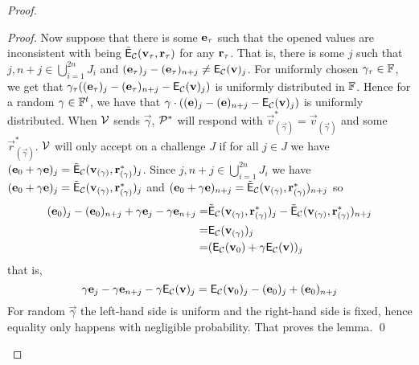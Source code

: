 \begin{proof}
\begin{proof}
Now suppose that there is some $\mathbf{e}_{\tau}$ such that the opened values are inconsistent with being $\tilde{\mathsf{E}}_{\mathcal{C}}(\mathbf{v}_\tau,\mathbf{r}_\tau)$ for any $\mathbf{r}_{\tau}$. That is, there is some $j$ such that $j,n+j\in \bigcup_{i=1}^{2n}J_i$ and $(\mathbf{e}_{\tau})_j-(\mathbf{e}_{\tau})_{n+j}\neq \mathsf{E}_{\mathcal{C}}(\mathbf{v})_j$. For uniformly chosen $\mathbf{\gamma}_\tau\in \mathbb{F}$, we get that $\mathbf{\gamma}_\tau((\mathbf{e}_{\tau})_j-(\mathbf{e}_{\tau})_{n+j}- \mathsf{E}_{\mathcal{C}}(\mathbf{v})_j)$ is uniformly distributed in $\mathbb{F}$. Hence for a random $\mathbf{\gamma}\in\mathbb{F}^t$, we have that $\mathbf{\gamma}\cdot ((\mathbf{e})_j-(\mathbf{e})_{n+j}- \mathsf{E}_{\mathcal{C}}(\mathbf{v})_j)$ is uniformly distributed. When $\mathcal{V}$ sends $\vec{\gamma}$, $\mathcal{P}^*$ will respond with $\vec{v}^*_{(\vec{\gamma})}=\vec{v}_{(\vec{\gamma})}$ and some $\vec{r}^*_{(\vec{\gamma})}$. 
$\mathcal{V}$ will only accept on a challenge $J$ if for all $j\in J$ we have $(\mathbf{e}_0+\mathbf{\gamma}\mathbf{e})_j=\tilde{\mathsf{E}}_{\mathcal{C}}(\mathbf{v}_{(\mathbf{\gamma})},\mathbf{r}^*_{(\mathbf{\gamma})})_j$. 
Since $j,n+j\in \bigcup_{i=1}^{2n} J_i$ we have $(\mathbf{e}_0+\mathbf{\gamma}\mathbf{e})_j=\tilde{\mathsf{E}}_{\mathcal{C}}(\mathbf{v}_{(\mathbf{\gamma})},\mathbf{r}^*_{(\mathbf{\gamma})})_j$ and $(\mathbf{e}_0+\mathbf{\gamma}\mathbf{e})_{n+j}=\tilde{\mathsf{E}}_{\mathcal{C}}(\mathbf{v}_{(\mathbf{\gamma})},\mathbf{r}^*_{(\mathbf{\gamma})})_{n+j}$ so 
\begin{align*}
(\mathbf{e}_0)_j-(\mathbf{e}_0)_{n+j}+\mathbf{\gamma}\mathbf{e}_j-\mathbf{\gamma}\mathbf{e}_{n+j}=&\tilde{\mathsf{E}}_{\mathcal{C}}(\mathbf{v}_{(\mathbf{\gamma})},\mathbf{r}^*_{(\mathbf{\gamma})})_j-\tilde{\mathsf{E}}_{\mathcal{C}}(\mathbf{v}_{(\mathbf{\gamma})},\mathbf{r}^*_{(\mathbf{\gamma})})_{n+j}\\
=&\mathsf{E}_{\mathcal{C}}(\mathbf{v}_{(\mathbf{\gamma})})_j\\ 
=& (\mathsf{E}_{\mathcal{C}}(\mathbf{v}_0)+\mathbf{\gamma} \mathsf{E}_{\mathcal{C}}(\mathbf{v}))_j
\end{align*}
that is, 
\[\mathbf{\gamma}\mathbf{e}_j-\mathbf{\gamma}\mathbf{e}_{n+j}-\mathbf{\gamma} \mathsf{E}_{\mathcal{C}}(\mathbf{v})_j=\mathsf{E}_{\mathcal{C}}(\mathbf{v}_0)_j-(\mathbf{e}_0)_j+(\mathbf{e}_0)_{n+j}\]
For random $\vec{\gamma}$ the left-hand side is uniform and the right-hand side is fixed, hence equality only happens with negligible probability. That proves the lemma. \qed
\end{proof}



\end{proof}
